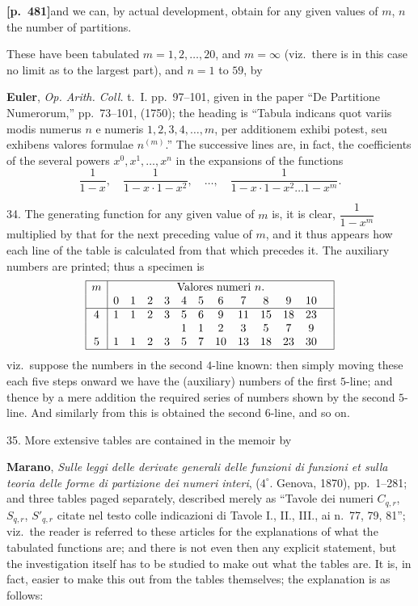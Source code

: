 \documentclass[11pt,a4paper]{article}
\begin{document}
\noindent\textbf{[p.~481]}\quad and we can, by actual development, obtain for any given values of $m$, $n$ the number of partitions.

These have been tabulated $m = 1, 2, \ldots, 20$, and $m = \infty$ (viz.\ there is in this case no limit as to the largest part), and $n = 1$ to $59$, by

\textbf{Euler}, \textit{Op. Arith. Coll.} t.~I. pp.~97--101, given in the paper ``De Partitione Numerorum,'' pp.~73--101, (1750); the heading is ``Tabula indicans quot variis modis numerus $n$ e numeris $1, 2, 3, 4, \ldots, m$, per additionem exhibi potest, seu exhibens valores formulae $n^{(m)}$.'' The successive lines are, in fact, the coefficients of the several powers $x^{0}, x^{1}, \ldots, x^{n}$ in the expansions of the functions
\[
\frac{1}{1-x},\quad \frac{1}{1-x \cdot 1-x^{2}},\quad \ldots,\quad \frac{1}{1-x \cdot 1-x^{2} \ldots 1-x^{m}}.
\]

34. The generating function for any given value of $m$ is, it is clear, $\dfrac{1}{1-x^{m}}$ multiplied by that for the next preceding value of $m$, and it thus appears how each line of the table is calculated from that which precedes it. The auxiliary numbers are printed; thus a specimen is
\[
\begin{array}{|c|cccccccccccc|}
\hline
m & \multicolumn{12}{c|}{\text{Valores numeri } n.}\\
 & 0 & 1 & 2 & 3 & 4 & 5 & 6 & 7 & 8 & 9 & 10 & \\
\hline
4 & 1 & 1 & 2 & 3 & 5 & 6 & 9 & 11 & 15 & 18 & 23 & \\
 &  &  &  &  & 1 & 1 & 2 & 3 & 5 & 7 & 9 & \\
5 & 1 & 1 & 2 & 3 & 5 & 7 & 10 & 13 & 18 & 23 & 30 & \\
\hline
\end{array}
\]
viz.\ suppose the numbers in the second $4$-line known: then simply moving these each five steps onward we have the (auxiliary) numbers of the first $5$-line; and thence by a mere addition the required series of numbers shown by the second $5$-line. And similarly from this is obtained the second $6$-line, and so on.

35. More extensive tables are contained in the memoir by

\textbf{Marano}, \textit{Sulle leggi delle derivate generali delle funzioni di funzioni et sulla teoria delle forme di partizione dei numeri interi}, ($4^{\circ}$. Genova, 1870), pp.~1--281; and three tables paged separately, described merely as ``Tavole dei numeri $C_{q,r}$, $S_{q,r}$, $S'_{q,r}$ citate nel testo colle indicazioni di Tavole I., II., III., ai n.~77, 79, 81''; viz.\ the reader is referred to these articles for the explanations of what the tabulated functions are; and there is not even then any explicit statement, but the investigation itself has to be studied to make out what the tables are. It is, in fact, easier to make this out from the tables themselves; the explanation is as follows:
\end{document}
